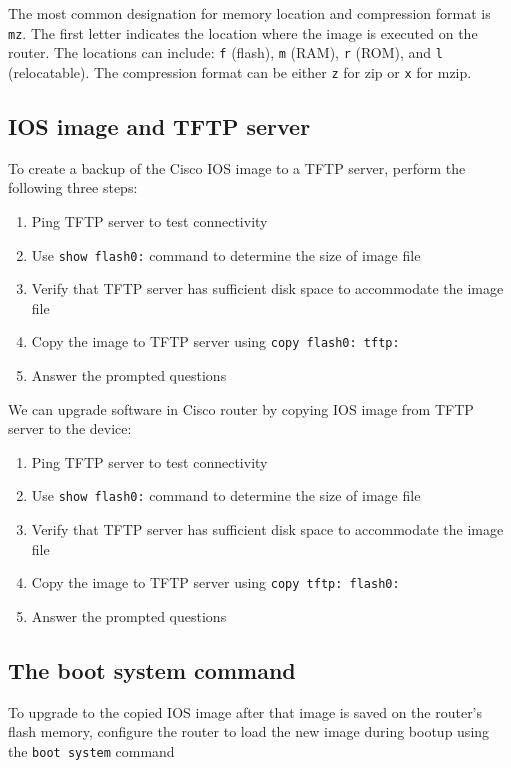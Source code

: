 The most common designation for memory location and compression format is \verb|mz|. The first letter indicates the location where the image is executed on the router. The locations can include: \verb|f| (flash), \verb|m| (RAM), \verb|r| (ROM), and \verb|l| (relocatable). The compression format can be either \verb|z| for zip or \verb|x| for mzip. 

\subsection{IOS image and TFTP server}

To create a backup of the Cisco IOS image to a TFTP server, perform the following three steps:

\begin{enumerate}
\item Ping TFTP server to test connectivity
\item Use \verb|show flash0:| command to determine the size of image file
\item Verify that TFTP server has sufficient disk space to accommodate the image file
\item Copy the image to TFTP server using \verb|copy flash0: tftp:|
\item Answer the prompted questions
\end{enumerate}

We can upgrade software in Cisco router by copying IOS image from TFTP server to the device:

\begin{enumerate}
\item Ping TFTP server to test connectivity
\item Use \verb|show flash0:| command to determine the size of image file
\item Verify that TFTP server has sufficient disk space to accommodate the image file
\item Copy the image to TFTP server using \verb|copy tftp: flash0:|
\item Answer the prompted questions
\end{enumerate}

\subsection{The boot system command}

To upgrade to the copied IOS image after that image is saved on the router's flash memory, configure the router to load the new image during bootup using the \verb|boot system| command

